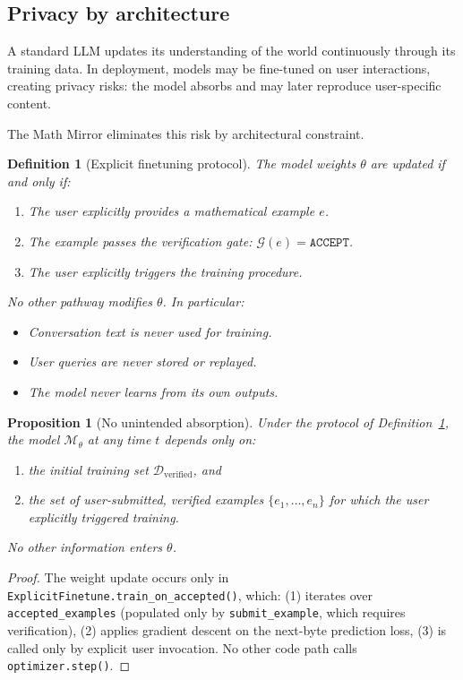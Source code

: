\documentclass[11pt,a4paper]{article}
\newtheorem{proposition}[theorem]{Proposition}
\newtheorem{definition}[theorem]{Definition}
\newcommand{\cM}{\mathcal{M}}
\newcommand{\cD}{\mathcal{D}}
\newcommand{\cG}{\mathcal{G}}
\begin{document}
\subsection{Privacy by architecture}

A standard LLM updates its understanding of the world
continuously through its training data.
In deployment, models may be fine-tuned on user interactions,
creating privacy risks: the model absorbs and may later
reproduce user-specific content.

The Math Mirror eliminates this risk by architectural constraint.

\begin{definition}[Explicit finetuning protocol]\label{def:finetune}
The model weights $\theta$ are updated if and only if:
\begin{enumerate}[label=(F\arabic*),nosep]
\item The user explicitly provides a mathematical example $e$.
\item The example passes the verification gate: $\cG(e) = \texttt{ACCEPT}$.
\item The user explicitly triggers the training procedure.
\end{enumerate}
No other pathway modifies $\theta$.
In particular:
\begin{itemize}[nosep]
\item Conversation text is never used for training.
\item User queries are never stored or replayed.
\item The model never learns from its own outputs.
\end{itemize}
\end{definition}

\begin{proposition}[No unintended absorption]\label{prop:privacy}
Under the protocol of Definition~\ref{def:finetune},
the model $\cM_\theta$ at any time $t$ depends only on:
\begin{enumerate}[label=(\alph*),nosep]
\item the initial training set $\cD_{\mathrm{verified}}$, and
\item the set of user-submitted, verified examples
  $\{e_1, \ldots, e_n\}$ for which the user explicitly
  triggered training.
\end{enumerate}
No other information enters $\theta$.
\end{proposition}

\begin{proof}
The weight update occurs only in
\texttt{ExplicitFinetune.train\_on\_accepted()}, which:
(1) iterates over \texttt{accepted\_examples} (populated
only by \texttt{submit\_example}, which requires verification),
(2) applies gradient descent on the next-byte prediction loss,
(3) is called only by explicit user invocation.
No other code path calls \texttt{optimizer.step()}.
\end{proof}
\end{document}
